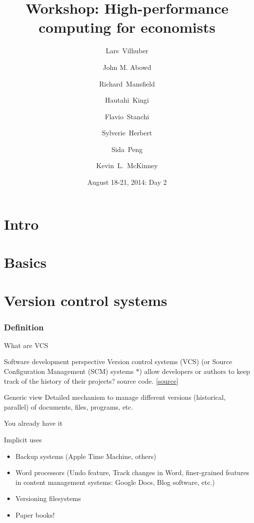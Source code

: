 \documentclass[xcolor=table,compress]{beamer}
\title[Computing for Economists]{Workshop: High-performance computing for economists}
\author[Many authors]{%
  Lars~Vilhuber\inst{1} \and
  John M. Abowd\inst{1} \and
  Richard~Mansfield\inst{1} \and
    Hautahi~Kingi\inst{1} \and
    Flavio~Stanchi\inst{1} \and
    Sylverie~Herbert\inst{1} \and
    Sida~Peng\inst{1} \and
  Kevin~L.~McKinney %
}
\institute[Cornell]{
  \inst{1}%
   Cornell University, Economics Department,
}%
\date[August 18-21, 2014]{August 18-21, 2014: Day 2}
\begin{document}
\frame{\titlepage}
\section{Intro}
\section{Basics}
\section[VCS]{Version control systems}


\subsubsection{Definition}

\begin{frame}{What are VCS}
\begin{block}{Software development perspective}
Version control systems (VCS) (or Source Configuration Management (SCM) systems $*$) allow developers or authors to keep track of the history of their projects? source code. [\href{http://better-scm.shlomifish.org/}{source}]

\end{block}
\pause
\begin{block}{Generic view}
Detailed mechanism to manage different versions (historical, parallel) of documents, files, programs, etc.
\end{block}
\end{frame}



\begin{frame}{You already have it}
\begin{block}{Implicit uses}
\begin{itemize}
\item Backup systems (Apple Time Machine, others)
\item Word processors (Undo feature, Track changes in Word, finer-grained features in content management systems: Google Docs, Blog software, etc.)
\item Versioning filesystems
\item Paper books!
\end{itemize}
\end{block}
\end{frame}
\end{document}
